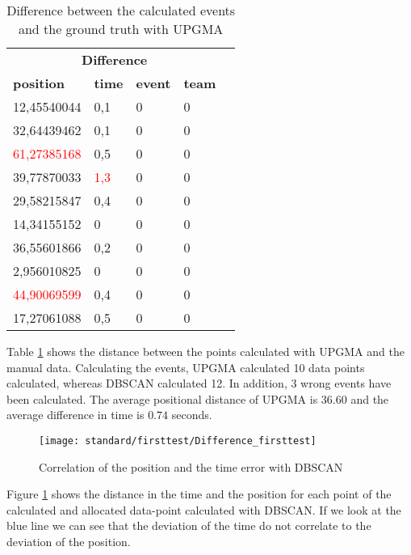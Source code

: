 \begin{table}[H]
    \begin{center}
		\begin{tabular}{|l|l|l|l|l}
			\hline
            \multicolumn{4}{|c|}{\large \textbf{Difference}} \\
			\hhline{====}
			\textbf{position} & \textbf{time} & \textbf{event} & \textbf{team} \\
			\hline
			12,45540044 & 0,1 & 0 & 0 \\
			\hline
            32,64439462 & 0,1 & 0 & 0 \\
			\hline
            \textcolor{red}{61,27385168} & 0,5 & 0 & 0 \\
			\hline
            39,77870033 & \textcolor{red}{1,3} & 0 & 0 \\
			\hline
            29,58215847 & 0,4 & 0 & 0 \\
			\hline
            14,34155152 & 0 & 0 & 0 \\
			\hline
            36,55601866 & 0,2 & 0 & 0 \\
			\hline
			2,956010825 & 0 & 0 & 0 \\
			\hline
			\textcolor{red}{44,90069599} & 0,4 & 0 & 0 \\
			\hline
            17,27061088 & 0,5 & 0 & 0 \\
			\hline
		\end{tabular}
    \end{center}
    \caption{Difference between the calculated events and the ground truth with UPGMA}
    \label{fig:diff:first:UPGMA}
\end{table}

Table \ref{fig:diff:first:UPGMA} shows the distance between the points calculated with UPGMA and the manual data. Calculating the events, UPGMA calculated 10 data points calculated, whereas DBSCAN calculated 12. In addition, 3 wrong events have been calculated. The average positional distance of UPGMA is $36.60$ and the average difference in time is $0.74$ seconds.


\begin{figure}[H]
    \centering
    \texttt{[image: standard/firsttest/Difference\_firsttest]}
    \caption{Correlation of the position and the time error with DBSCAN}
    \label{fig:dist_pos:first}
\end{figure}

Figure \ref{fig:dist_pos:first} shows the distance in the time and the position for each point of the calculated and allocated data-point calculated with DBSCAN. If we look at the blue line we can see that the deviation of the time do not correlate to the deviation of the position. 
